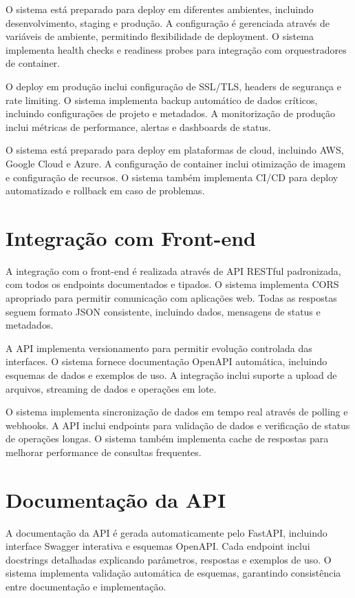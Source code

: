 \documentclass[12pt,a4paper]{article}
\begin{document}
O sistema está preparado para deploy em diferentes ambientes, incluindo desenvolvimento, staging e produção. A configuração é gerenciada através de variáveis de ambiente, permitindo flexibilidade de deployment. O sistema implementa health checks e readiness probes para integração com orquestradores de container.

O deploy em produção inclui configuração de SSL/TLS, headers de segurança e rate limiting. O sistema implementa backup automático de dados críticos, incluindo configurações de projeto e metadados. A monitorização de produção inclui métricas de performance, alertas e dashboards de status.

O sistema está preparado para deploy em plataformas de cloud, incluindo AWS, Google Cloud e Azure. A configuração de container inclui otimização de imagem e configuração de recursos. O sistema também implementa CI/CD para deploy automatizado e rollback em caso de problemas.

\section{Integração com Front-end}

A integração com o front-end é realizada através de API RESTful padronizada, com todos os endpoints documentados e tipados. O sistema implementa CORS apropriado para permitir comunicação com aplicações web. Todas as respostas seguem formato JSON consistente, incluindo dados, mensagens de status e metadados.

A API implementa versionamento para permitir evolução controlada das interfaces. O sistema fornece documentação OpenAPI automática, incluindo esquemas de dados e exemplos de uso. A integração inclui suporte a upload de arquivos, streaming de dados e operações em lote.

O sistema implementa sincronização de dados em tempo real através de polling e webhooks. A API inclui endpoints para validação de dados e verificação de status de operações longas. O sistema também implementa cache de respostas para melhorar performance de consultas frequentes.

\section{Documentação da API}

A documentação da API é gerada automaticamente pelo FastAPI, incluindo interface Swagger interativa e esquemas OpenAPI. Cada endpoint inclui docstrings detalhadas explicando parâmetros, respostas e exemplos de uso. O sistema implementa validação automática de esquemas, garantindo consistência entre documentação e implementação.
\end{document}
